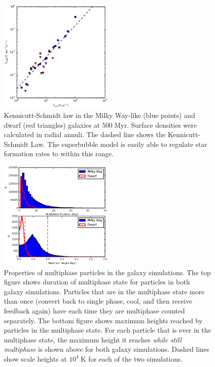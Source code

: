 \begin{figure}
    \includegraphics[width=0.5\textwidth]{figures1/kennicutt_schmidt.eps}
    \caption[Kennicutt-Schmidt law for isolated galaxies]{Kennicutt-Schmidt law
    in the Milky Way-like (blue points) and dwarf (red triangles) galaxies at
    $500\;\mathrm{Myr}$. Surface densities were calculated in radial annuli.
    The dashed line shows the Kennicutt-Schmidt Law.  The superbubble model is
    easily able to regulate star formation rates to within this range.}
    \label{kennicutt_schmidt}
\end{figure}

\begin{figure}
    \includegraphics[width=0.5\textwidth]{figures1/multiphase_properties.eps}
    \caption[Properties of multiphase particles]{Properties of multiphase
    particles in the galaxy simulations.  The top figure shows duration of
    multiphase state for particles in both galaxy simulations.  Particles that
    are in the multiphase state more than once (convert back to single phase,
    cool, and then receive feedback again) have each time they are multiphase
    counted separately. The bottom figure shows maximum heights reached by
    particles in the multiphase state.  For each particle that is ever in the
    multiphase state, the maximum height it reaches {\it while still multiphase}
    is shown above for both galaxy simulations.  Dashed lines show scale heights
    at $10^4\;\mathrm{K}$ for each of the two simulations.}
    \label{multiphase_properties}
\end{figure}

